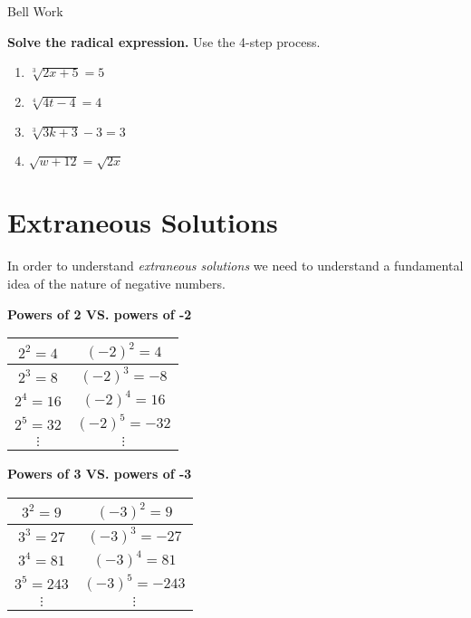 \documentclass[12pt]{article}
\begin{document}
\pagebreak

\begin{center}
	\begin{Large}
		Bell Work\\
	\end{Large}
\end{center}

\textbf{Solve the radical expression.} Use the 4-step process.\\

\begin{enumerate}

	\item $\sqrt[3]{2x+5}=5$\\
	
	
	\item $\sqrt[4]{4t-4}=4$\\
	
	
	\item $\sqrt[3]{3k+3}-3=3$\\
	
	
	\item $\sqrt{w+12}=\sqrt{2x}$\\
\end{enumerate}

\pagebreak

\section{Extraneous Solutions}
In order to understand \textit{extraneous solutions} we need to understand a fundamental idea of the nature of negative numbers.\\

\begin{multicols}{2}

\textbf{Powers of 2 VS. powers of -2}\\

\begin{tabular}{|c|c|}

\hline

$2^2=4$ & $(-2)^2=4$\\
\hline
$2^3=8$ & $(-2)^3=-8$\\
\hline
$2^4=16$ & $(-2)^4=16$\\
\hline
$2^5=32$ & $(-2)^5=-32$\\
\hline
$\vdots$ & $\vdots$

\end{tabular}

\textbf{Powers of 3 VS. powers of -3}\\

\begin{tabular}{|c|c|}

\hline

$3^2=9$ & $(-3)^2=9$\\
\hline
$3^3=27$ & $(-3)^3=-27$\\
\hline
$3^4=81$ & $(-3)^4=81$\\
\hline
$3^5=243$ & $(-3)^5=-243$\\
\hline
$\vdots$ & $\vdots$

\end{tabular}

\end{multicols}
\end{document}
